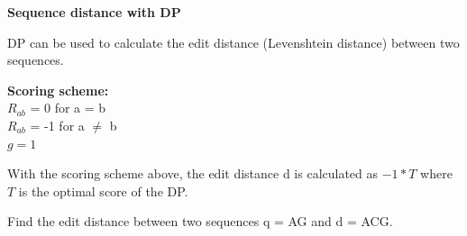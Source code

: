 \question \textbf{Sequence distance with DP}

DP can be used to calculate the edit distance (Levenshtein distance) between two sequences.

\medskip 

\textbf{Scoring scheme: }\\
\null \quad $R_{ab}$ = 0 for a = b \\ 
\null \quad $R_{ab}$ = -1 for a $\neq$ b \\ 
\null \quad $g = 1$

\vspace{0.1 in}


\vspace{0.1 in}

With the scoring scheme above, the edit distance d is calculated as $-1 * T$ where $T$ is the optimal score of the DP.

Find the edit distance between two sequences q = AG and d = ACG.

